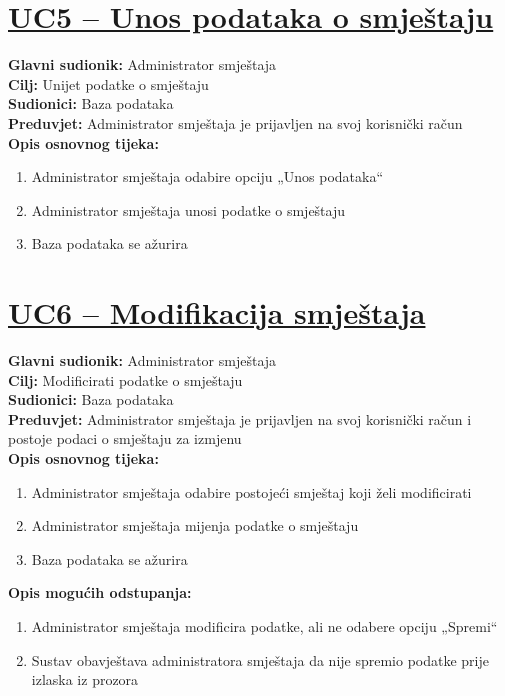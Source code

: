 \documentclass{article}
\begin{document}
	\section*{\underline{UC5 – Unos podataka o smještaju}}
	\textbf{Glavni sudionik:} Administrator smještaja \\
	\textbf{Cilj:} Unijet podatke o smještaju \\
	\textbf{Sudionici:} Baza podataka \\
	\textbf{Preduvjet:} Administrator smještaja je prijavljen na svoj korisnički račun \\
	\textbf{Opis osnovnog tijeka:}
	\begin{enumerate}
		\item Administrator smještaja odabire opciju „Unos podataka“
		\item Administrator smještaja unosi podatke o smještaju
		\item Baza podataka se ažurira
	\end{enumerate}
	
	\section*{\underline{UC6 – Modifikacija smještaja}}
	\textbf{Glavni sudionik:} Administrator smještaja \\
	\textbf{Cilj:} Modificirati podatke o smještaju \\
	\textbf{Sudionici:} Baza podataka \\
	\textbf{Preduvjet:} Administrator smještaja je prijavljen na svoj korisnički račun i postoje podaci o smještaju za izmjenu \\
	\textbf{Opis osnovnog tijeka:}
	\begin{enumerate}
		\item Administrator smještaja odabire postojeći smještaj koji želi modificirati
		\item Administrator smještaja mijenja podatke o smještaju
		\item Baza podataka se ažurira
	\end{enumerate}
	\textbf{Opis mogućih odstupanja:}
	\begin{enumerate}
		\item Administrator smještaja modificira podatke, ali ne odabere opciju „Spremi“
		\item Sustav obavještava administratora smještaja da nije spremio podatke prije izlaska iz prozora
	\end{enumerate}
\end{document}
